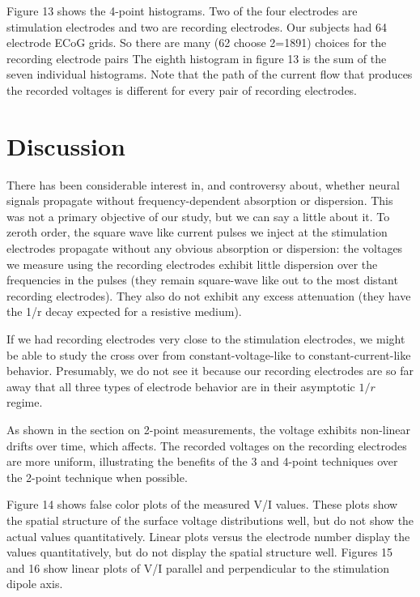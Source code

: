 Figure 13 shows the 4-point histograms.
Two of the four electrodes are stimulation electrodes and two are recording electrodes. Our subjects had 64 electrode ECoG grids. So there are many (62 choose 2=1891) choices for the recording electrode pairs The eighth histogram in figure 13 is the sum of the seven individual histograms. Note that the path of the current flow that produces the recorded voltages is different for every pair of recording electrodes.

\section{Discussion}

There has been considerable interest in, and controversy about, whether neural signals propagate without  frequency-dependent absorption or dispersion\cite{Miceli2017}. This was not a primary objective of our study, but we can say a little about it. To zeroth order, the square wave like current pulses we inject at the stimulation electrodes propagate without any obvious absorption or dispersion: the voltages we measure using the recording electrodes exhibit little dispersion over the frequencies in the pulses (they remain square-wave like out to the most distant recording electrodes). They also do not exhibit any excess attenuation (they have the 1/r decay expected for a resistive medium).  

If we had recording electrodes very close to the stimulation electrodes, we might be able to study the cross over from constant-voltage-like
to constant-current-like behavior. Presumably, we do not see it because our recording electrodes are so far away that all three types of 
electrode behavior are in their asymptotic $1/r$ regime.

As shown in the section on 2-point measurements, the voltage exhibits non-linear drifts over time, which affects. The recorded voltages on the recording electrodes are more uniform, illustrating the benefits of the 3 and 4-point techniques over the 2-point technique when possible. 

Figure 14 shows false color plots of the measured V/I values. 
These plots show the spatial structure of the surface voltage distributions well, but do not show the actual values quantitatively.
Linear plots versus the electrode number display the values quantitatively, but do not display the spatial structure well. 
Figures 15 and 16 show linear plots of V/I parallel and perpendicular to the stimulation dipole axis.


